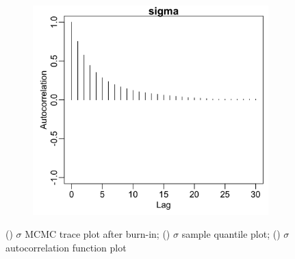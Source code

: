 \documentclass{uwstat572}
\begin{document}
\begin{figure}[H]
\begin{subfigure}[b]{0.49\textwidth}
		\includegraphics[width=\textwidth]{figures/mcmc_acf_plot_sigma.png}
		\caption{}
		\label{fig:acf_sigma}
	\end{subfigure}
	\caption{() $\sigma$ MCMC trace plot after burn-in; () $\sigma$ sample quantile plot; () $\sigma$ autocorrelation function plot  }
	\label{fig:diagnostics_sigma}
\end{figure} 
\end{document}
